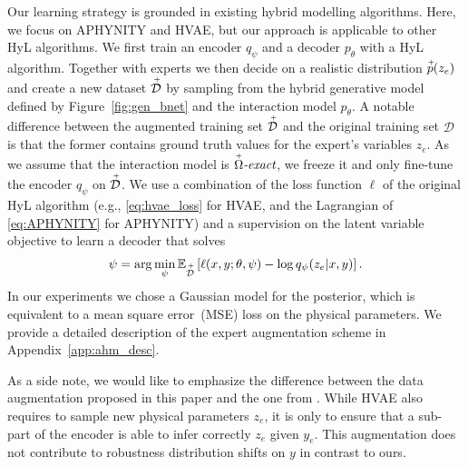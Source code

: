 \documentclass{article}
\newcommand\figref{Figure~\ref}
\newcommand\appref{Appendix~\ref}
\begin{document}
Our learning strategy is grounded in existing hybrid modelling algorithms. Here, we focus on APHYNITY and HVAE, but our approach is applicable to other HyL algorithms. We first train an encoder $q_\psi$ and a decoder $p_\theta$ with a HyL algorithm. Together with experts we then decide on a realistic distribution $\accentset{+}{p}(z_e)$ and create a new dataset $\accentset{+}{\mathcal{D}}$ by sampling from the hybrid generative model defined by \figref{fig:gen_bnet} and the interaction model $p_\theta$. A notable difference between the augmented training set $\accentset{+}{\mathcal{D}}$ and the original training set $\mathcal{D}$ is that the former contains ground truth values for the expert's variables $z_e$. As we assume that the interaction model is $\accentset{+}{\Omega}\textit{-exact}$, we freeze it and only fine-tune the encoder $q_\psi$ on $\accentset{+}{\mathcal{D}}$. We use a combination of the loss function $\ell$ of the original HyL algorithm (e.g., \eqref{eq:hvae_loss} for HVAE, and the Lagrangian of \eqref{eq:APHYNITY} for APHYNITY) and a supervision on the latent variable objective to learn a decoder that solves
\begin{align}
    \psi = \arg\min_{\psi} \mathbb{E}_{\accentset{+}{\mathcal{D}}}\left[ \ell(x, y; \theta, \psi) - \log q_\psi(z_e|x, y) \right]. \nonumber
\end{align}
In our experiments we chose a Gaussian model for the posterior, which is equivalent to a mean square error~(MSE) loss on the physical parameters. We provide a detailed description of the expert augmentation scheme in \appref{app:ahm_desc}.

As a side note, we would like to emphasize the difference between the data augmentation proposed in this paper and the one from \citet{HVAE}. While HVAE also requires to sample new physical parameters $z_e$, it is only to ensure that a sub-part of the encoder is able to infer correctly $z_e$ given $y_e$. This augmentation does not contribute to robustness distribution shifts on $y$ in contrast to ours.

\end{document}
